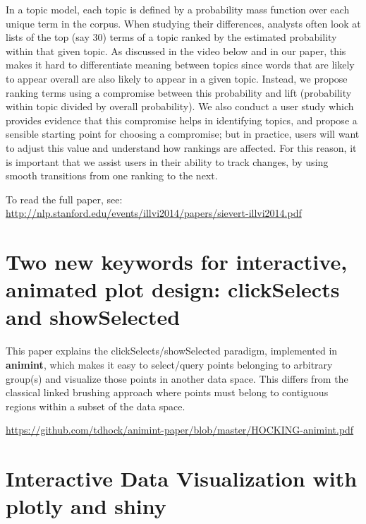 \documentclass[11pt]{isuthesis}
\begin{document}
In a topic model, each topic is defined by a probability mass function
over each unique term in the corpus. When studying their differences,
analysts often look at lists of the top (say 30) terms of a topic ranked
by the estimated probability within that given topic. As discussed in
the video below and in our paper, this makes it hard to differentiate
meaning between topics since words that are likely to appear overall are
also likely to appear in a given topic. Instead, we propose ranking
terms using a compromise between this probability and lift (probability
within topic divided by overall probability). We also conduct a user
study which provides evidence that this compromise helps in identifying
topics, and propose a sensible starting point for choosing a compromise;
but in practice, users will want to adjust this value and understand how
rankings are affected. For this reason, it is important that we assist
users in their ability to track changes, by using smooth transitions
from one ranking to the next.

To read the full paper, see:
\url{http://nlp.stanford.edu/events/illvi2014/papers/sievert-illvi2014.pdf}

\chapter{Two new keywords for interactive, animated plot design:
clickSelects and
showSelected}\label{two-new-keywords-for-interactive-animated-plot-design-clickselects-and-showselected}

This paper explains the clickSelects/showSelected paradigm, implemented
in \textbf{animint}, which makes it easy to select/query points
belonging to arbitrary group(s) and visualize those points in another
data space. This differs from the classical linked brushing approach
where points must belong to contiguous regions within a subset of the
data space.

\url{https://github.com/tdhock/animint-paper/blob/master/HOCKING-animint.pdf}

\chapter{Interactive Data Visualization with plotly and
shiny}\label{interactive-data-visualization-with-plotly-and-shiny}
\end{document}
